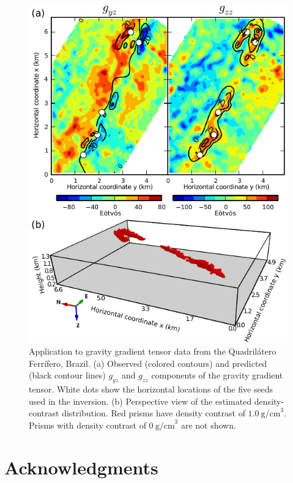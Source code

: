 \documentclass{segabs}
\begin{document}
\begin{figure}[htb]
    \includegraphics[width=\columnwidth]{real/quadrilatero/fig/quadrilatero}
    \caption{Application to gravity gradient tensor data from the
        Quadril\'atero Ferr\'ifero, Brazil. (a) Observed (colored contours) and
        predicted (black contour lines) $g_{yz}$ and $g_{zz}$ components of
        the gravity gradient tensor. White dots show the horizontal locations
        of the five seeds used in the inversion. (b) Perspective view of the
        estimated density-contrast distribution.
        Red prisms have density contrast of $1.0\ \mathrm{g/cm}^3$.
        Prisms with density contrast of $0\ \mathrm{g/cm}^3$ are not shown.
    \label{fig:qf}}
\end{figure}


\section{Acknowledgments}
\end{document}
